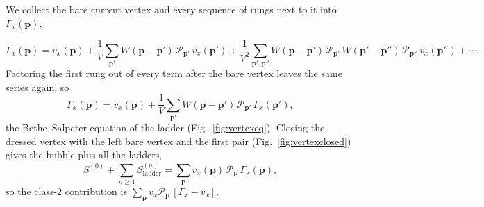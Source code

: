 We collect the bare current vertex and every sequence of rungs next to it
into $\Gamma_x(\mathbf p)$,
\begin{center}
\end{center}
\[
\Gamma_x(\mathbf p)=v_x(\mathbf p)
+\frac1V\sum_{\mathbf p'}W(\mathbf p-\mathbf p')\,\mathcal P_{\mathbf p'}\,v_x(\mathbf p')
+\frac1{V^2}\sum_{\mathbf p',\mathbf p''}W(\mathbf p-\mathbf p')\,\mathcal P_{\mathbf p'}\,
W(\mathbf p'-\mathbf p'')\,\mathcal P_{\mathbf p''}\,v_x(\mathbf p'')+\cdots .
\]
Factoring the first rung out of every term after the bare vertex leaves
the same series again, so
\begin{equation}
\Gamma_x(\mathbf p)=v_x(\mathbf p)
+\frac1V\sum_{\mathbf p'}W(\mathbf p-\mathbf p')\,\mathcal P_{\mathbf p'}\,\Gamma_x(\mathbf p'),
\label{eq:vertex}
\end{equation}
the Bethe--Salpeter equation of the ladder (Fig.~\ref{fig:vertexeq}).
Closing the dressed vertex with the left bare vertex and the first pair
(Fig.~\ref{fig:vertexclosed}) gives the bubble plus all the ladders,
\[
S^{(0)}+\sum_{n\ge1}S^{(n)}_{\mathrm{ladder}}
=\sum_{\mathbf p}v_x(\mathbf p)\,\mathcal P_{\mathbf p}\,\Gamma_x(\mathbf p),
\]
so the class-2 contribution is
$\sum_{\mathbf p}v_x\mathcal P_{\mathbf p}\,[\Gamma_x-v_x]$.

